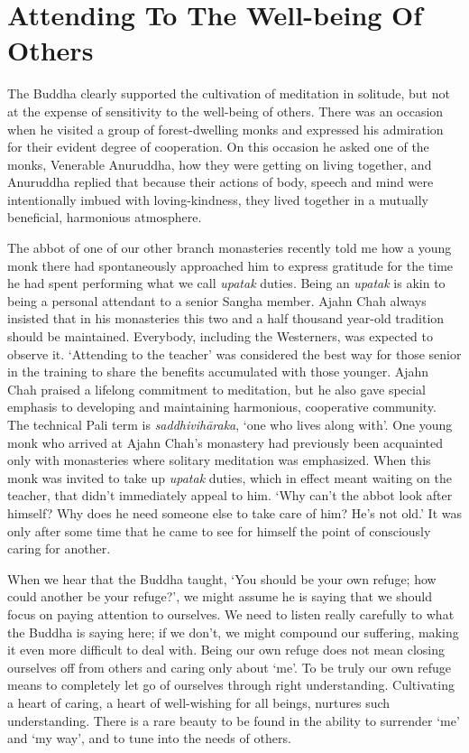 \section{Attending To The Well-being Of Others}

The Buddha clearly supported the cultivation of meditation in solitude,
but not at the expense of sensitivity to the well-being of others. There
was an occasion when he visited a group of forest-dwelling monks and
expressed his admiration for their evident degree of cooperation. On
this occasion he asked one of the monks, Venerable Anuruddha, how they
were getting on living together, and Anuruddha replied that because
their actions of body, speech and mind were intentionally imbued with
loving-kindness, they lived together in a mutually beneficial,
harmonious atmosphere.

The abbot of one of our other branch monasteries recently told me how a
young monk there had spontaneously approached him to express gratitude
for the time he had spent performing what we call \emph{upatak} duties. Being
an \emph{upatak} is akin to being a personal attendant to a senior Sangha
member. Ajahn Chah always insisted that in his monasteries this two and
a half thousand year-old tradition should be maintained. Everybody,
including the Westerners, was expected to observe it. ‘Attending to the
teacher’ was considered the best way for those senior in the training to
share the benefits accumulated with those younger. Ajahn Chah praised a
lifelong commitment to meditation, but he also gave special emphasis to
developing and maintaining harmonious, cooperative community. The
technical Pali term is \emph{saddhivihāraka}, ‘one who lives along with’. One
young monk who arrived at Ajahn Chah’s monastery had previously been
acquainted only with monasteries where solitary meditation was
emphasized. When this monk was invited to take up \emph{upatak} duties, which
in effect meant waiting on the teacher, that didn’t immediately appeal
to him. ‘Why can’t the abbot look after himself? Why does he need
someone else to take care of him? He’s not old.’ It was only after some
time that he came to see for himself the point of consciously caring for
another.

When we hear that the Buddha taught, ‘You should be your own refuge; how could
another be your refuge?’\cite{dhp-attahi},
we might assume he is saying that
we should focus on paying attention to ourselves. We need to listen
really carefully to what the Buddha is saying here; if we don’t, we
might compound our suffering, making it even more difficult to deal
with. Being our own refuge does not mean closing ourselves off from
others and caring only about ‘me’. To be truly our own refuge means to
completely let go of ourselves through right understanding. Cultivating
a heart of caring, a heart of well-wishing for all beings, nurtures such
understanding. There is a rare beauty to be found in the ability to
surrender ‘me’ and ‘my way’, and to tune into the needs of others.

